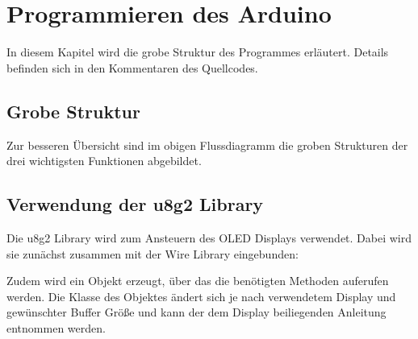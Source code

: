 \documentclass[letterpaper,10pt,ngerman]{sphinxmanual}
\let\sphinxpxdimen\pdfpxdimen\else\newdimen\sphinxpxdimen
\begin{document}
\chapter{Programmieren des Arduino}
\label{\detokenize{programming:programmieren-des-arduino}}\label{\detokenize{programming::doc}}
In diesem Kapitel wird die grobe Struktur des Programmes erläutert. Details
befinden sich in den Kommentaren des Quellcodes.


\section{Grobe Struktur}
\label{\detokenize{programming:grobe-struktur}}
\noindent\sphinxincludegraphics[width=700\sphinxpxdimen]{{pap}.png}

Zur besseren Übersicht sind im obigen Flussdiagramm die groben Strukturen der
drei wichtigsten Funktionen abgebildet.


\section{Verwendung der u8g2 Library}
\label{\detokenize{programming:verwendung-der-u8g2-library}}
Die u8g2 Library wird zum Ansteuern des OLED Displays verwendet. Dabei wird
sie zunächst zusammen mit der Wire Library eingebunden:

\begin{sphinxVerbatim}[commandchars=\\\{\}]
 
 
\end{sphinxVerbatim}

Zudem wird ein Objekt erzeugt, über das die benötigten Methoden auferufen
werden. Die Klasse des Objektes ändert sich je nach verwendetem Display und
gewünschter Buffer Größe und kann der dem Display beiliegenden Anleitung
entnommen werden.

\begin{sphinxVerbatim}[commandchars=\\\{\}]
   
\end{sphinxVerbatim}
\end{document}
